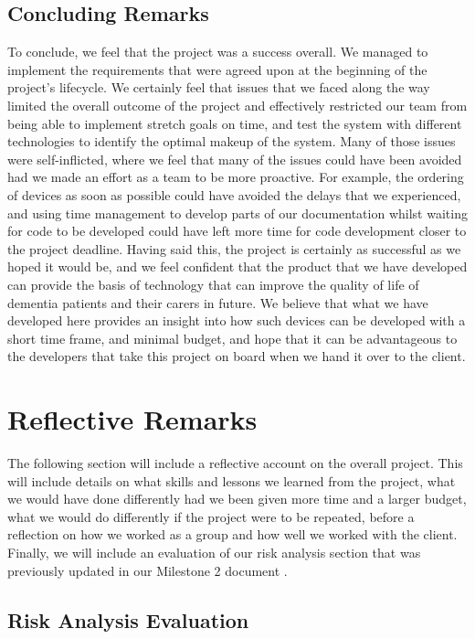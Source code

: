         \subsection{Concluding Remarks}

            To conclude, we feel that the project was a success overall. We managed to implement the requirements that were agreed upon at the beginning of the project's lifecycle. We certainly feel that issues that we faced along the way limited the overall outcome of the project and effectively restricted our team from being able to implement stretch goals on time, and test the system with different technologies to identify the optimal makeup of the system. Many of those issues were self-inflicted, where we feel that many of the issues could have been avoided had we made an effort as a team to be more proactive. For example, the ordering of devices as soon as possible could have avoided the delays that we experienced, and using time management to develop parts of our documentation whilst waiting for code to be developed could have left more time for code development closer to the project deadline. Having said this, the project is certainly as successful as we hoped it would be, and we feel confident that the product that we have developed can provide the basis of technology that can improve the quality of life of dementia patients and their carers in future. We believe that what we have developed here provides an insight into how such devices can be developed with a short time frame, and minimal budget, and hope that it can be advantageous to the developers that take this project on board when we hand it over to the client.

    
    \section{Reflective Remarks}

        The following section will include a reflective account on the overall project. This will include details on what skills and lessons we learned from the project, what we would have done differently had we been given more time and a larger budget, what we would do differently if the project were to be repeated, before a reflection on how we worked as a group and how well we worked with the client. Finally, we will include an evaluation of our risk analysis section that was previously updated in our Milestone 2 document \cite{mile2}.

        \subsection{Risk Analysis Evaluation}
        \label{subsec:risk}


